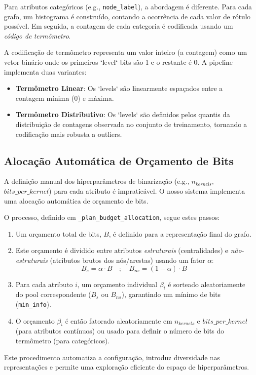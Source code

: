 \documentclass[12pt]{article}
\begin{document}
Para atributos categóricos (e.g., \texttt{node\_label}), a abordagem é diferente. Para cada grafo, um histograma é construído, contando a ocorrência de cada valor de rótulo possível. Em seguida, a contagem de cada categoria é codificada usando um \textit{código de termômetro}.

A codificação de termômetro representa um valor inteiro (a contagem) como um vetor binário onde os primeiros `level` bits são 1 e o restante é 0. A pipeline implementa duas variantes:
\begin{itemize}
    \item \textbf{Termômetro Linear}: Os `levels` são linearmente espaçados entre a contagem mínima (0) e máxima.
    \item \textbf{Termômetro Distributivo}: Os `levels` são definidos pelos quantis da distribuição de contagens observada no conjunto de treinamento, tornando a codificação mais robusta a outliers.
\end{itemize}

\subsection{Alocação Automática de Orçamento de Bits}

A definição manual dos hiperparâmetros de binarização (e.g., $n_{kernels}$, $bits\_per\_kernel$) para cada atributo é impraticável. O nosso sistema implementa uma alocação automática de orçamento de bits.

O processo, definido em \texttt{\_plan\_budget\_allocation}, segue estes passos:
\begin{enumerate}
    \item Um orçamento total de bits, $B$, é definido para a representação final do grafo.
    \item Este orçamento é dividido entre atributos \textit{estruturais} (centralidades) e \textit{não-estruturais} (atributos brutos dos nós/arestas) usando um fator $\alpha$:
    \begin{equation}
        B_s = \alpha \cdot B \quad ; \quad B_{ns} = (1 - \alpha) \cdot B
    \end{equation}
    \item Para cada atributo $i$, um orçamento individual $\beta_i$ é sorteado aleatoriamente do pool correspondente ($B_s$ ou $B_{ns}$), garantindo um mínimo de bits (\texttt{min\_info}).
    \item O orçamento $\beta_i$ é então fatorado aleatoriamente em $n_{kernels}$ e $bits\_per\_kernel$ (para atributos contínuos) ou usado para definir o número de bits do termômetro (para categóricos).
\end{enumerate}
Este procedimento automatiza a configuração, introduz diversidade nas representações e permite uma exploração eficiente do espaço de hiperparâmetros.
\end{document}
